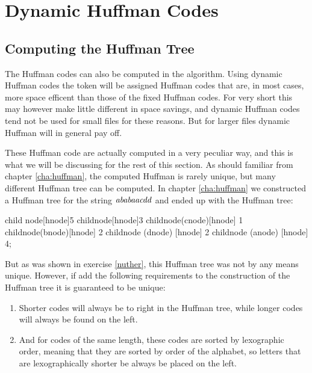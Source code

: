 \section{Dynamic Huffman Codes}
\label{sec:dynamic-huffman-codes}

\subsection{Computing the Huffman Tree}

The Huffman codes can also be computed in the  algorithm. Using
dynamic Huffman codes the token will be assigned Huffman codes that
are, in most cases, more space efficent than those of the fixed
Huffman codes. For very short this may however make little different
in space savings, and dynamic Huffman codes tend not be used for small
files for these reasons. But for larger files dynamic Huffman will in
general pay off.

These Huffman code are actually computed in a very peculiar way, and
this is what we will be discussing for the rest of this section. As should
familiar from chapter \ref{cha:huffman}, the computed Huffman is
rarely unique, but many different Huffman tree can be computed. In
chapter \ref{cha:huffman} we constructed a Huffman tree for the string
$\mathit{ababaacdd}$ and ended up with the Huffman tree:

\begin{huffmanc}
  child {node[hnode]{5}
    child{node[hnode]{3}
      child{node(cnode)[hnode] {1}}
      child{node(bnode)[hnode] {2}}}
    child{node (dnode) [hnode] {2}}}
  child{node (anode) [hnode] {4}};

\end{huffmanc}

But as was shown in exercise \ref{nuther}, this Huffman tree was not
by any means unique. However, if add the following requirements to the
construction of the Huffman tree it is guaranteed to be unique:

\begin{enumerate}
\item Shorter codes will always be to right in the Huffman tree, while
  longer codes will always be found on the left.
\item And for codes of the same length, these codes are sorted by
  lexographic order, meaning that they are sorted by order of the
  alphabet, so letters that are lexographically shorter be always be
  placed on the left.
\end{enumerate}

